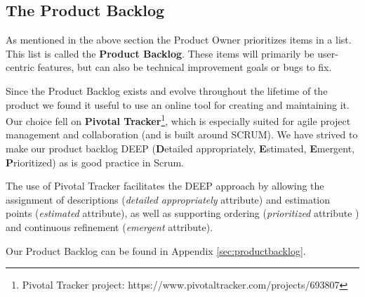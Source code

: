 \subsection{The Product Backlog}

As mentioned in the above section the Product Owner prioritizes items in a list. This list is called the \textbf{Product Backlog}. These items will primarily be user-centric features, but can also be technical improvement goals or bugs to fix.

Since the Product Backlog exists and evolve throughout the lifetime of the product we found it useful to use an online tool for creating and maintaining it. Our choice fell on \textbf{Pivotal Tracker}\footnote{Pivotal Tracker project: https://www.pivotaltracker.com/projects/693807}, which is especially suited for agile project management and collaboration (and is built around SCRUM). We have strived to make our product backlog DEEP (\textbf{D}etailed appropriately, \textbf{E}stimated, \textbf{E}mergent, \textbf{P}rioritized) as is good practice in Scrum.

The use of Pivotal Tracker facilitates the DEEP approach by allowing the assignment of descriptions (\textit{detailed appropriately} attribute) and  estimation points (\textit{estimated} attribute), as well as supporting  ordering (\textit{prioritized} attribute ) and continuous refinement (\textit{emergent} attribute).

Our Product Backlog can be found in Appendix \ref{sec:productbacklog}.
